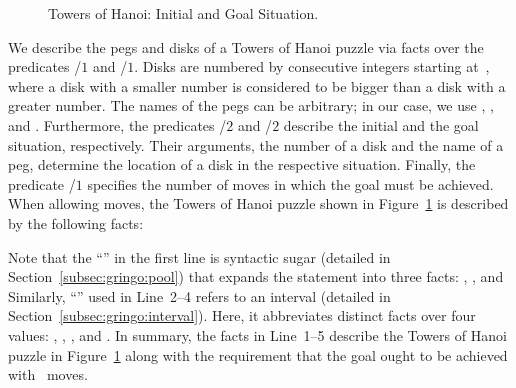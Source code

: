 \begin{figure}[tb]
\centering
\hanoiInstance
\caption{Towers of Hanoi: Initial and Goal Situation.\label{fig:toh_inst}}
\end{figure}
We describe the pegs and disks of a Towers of Hanoi puzzle via facts over the predicates
/$1$ and /$1$. %
Disks are numbered by consecutive integers starting at~,
where a disk with a smaller number is considered to be bigger than a disk with a greater number.
The names of the pegs can be arbitrary; in our case, we use , , and . 
Furthermore, the predicates /$2$ and /$2$ describe the initial
and the goal situation, respectively.
Their arguments, the number of a disk and the name of a peg,
determine the location of a disk in the respective situation.
Finally, the predicate /$1$ specifies the number of moves 
in which the goal must be achieved.
When allowing  moves,
the Towers of Hanoi puzzle shown in Figure~\ref{fig:toh_inst} %
is described by the following facts:%
%
%

%
Note that the ``\code{;}'' in the first line is syntactic sugar
(detailed in Section~\ref{subsec:gringo:pool})
that expands the statement into three facts:
, , and 
Similarly, ``'' used in Line~2--4
refers to an interval (detailed in Section~\ref{subsec:gringo:interval}).
Here, it abbreviates distinct facts over four values:
, , , and .
In summary, the facts in Line~1--5 describe the 
Towers of Hanoi puzzle in Figure~\ref{fig:toh_inst} along
with the requirement that the goal ought to be achieved with~ moves.

